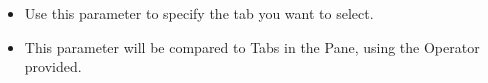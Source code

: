 \begin{itemize}
\item Use this parameter to specify the tab you want to select.
\item This parameter will be compared to Tabs in the Pane, using the Operator provided.
\end{itemize}
